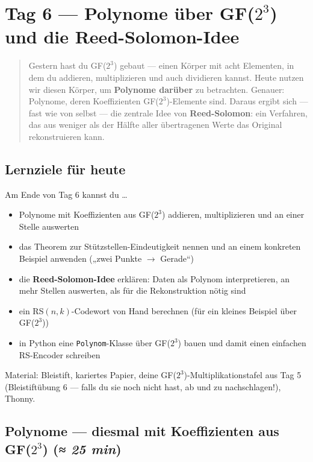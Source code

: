 \chapter{Tag 6 — Polynome über GF($2^3$) und die Reed-Solomon-Idee}

\begin{quote}
Gestern hast du GF($2^3$) gebaut — einen Körper mit acht Elementen,
in dem du addieren, multiplizieren und auch dividieren kannst. Heute
nutzen wir diesen Körper, um \textbf{Polynome darüber} zu betrachten.
Genauer: Polynome, deren Koeffizienten GF($2^3$)-Elemente sind. Daraus
ergibt sich — fast wie von selbst — die zentrale Idee von
\textbf{Reed-Solomon}: ein Verfahren, das aus weniger als der Hälfte
aller übertragenen Werte das Original rekonstruieren kann.
\end{quote}

\section*{Lernziele für heute}

Am Ende von Tag 6 kannst du \dots

\begin{itemize}
\item Polynome mit Koeffizienten aus GF($2^3$) addieren, multiplizieren
  und an einer Stelle auswerten
\item das Theorem zur Stützstellen-Eindeutigkeit nennen und an einem
  konkreten Beispiel anwenden („zwei Punkte $\to$ Gerade“)
\item die \textbf{Reed-Solomon-Idee} erklären: Daten als Polynom
  interpretieren, an mehr Stellen auswerten, als für die Rekonstruktion
  nötig sind
\item ein RS$(n, k)$-Codewort von Hand berechnen (für ein kleines
  Beispiel über GF($2^3$))
\item in Python eine \texttt{Polynom}-Klasse über GF($2^3$) bauen und
  damit einen einfachen RS-Encoder schreiben
\end{itemize}

Material: Bleistift, kariertes Papier, deine GF($2^3$)-Multiplikationstafel
aus Tag 5 (Bleistiftübung 6 — falls du sie noch nicht hast, ab und zu
nachschlagen!), Thonny.

\section{Polynome — diesmal mit Koeffizienten aus GF($2^3$) \normalfont(\textit{≈ 25 min})}


